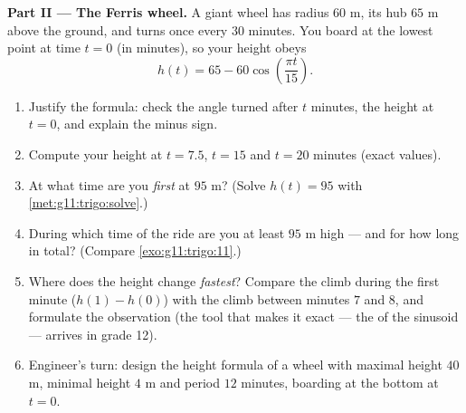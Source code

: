 \begin{problem}
\medskip
\noindent\textbf{Part II --- The Ferris wheel.}
A giant wheel has radius $60$ m, its hub $65$ m above the
ground, and turns once every $30$ minutes. You board at the
lowest point at time $t = 0$ (in minutes), so your height obeys
\[
h(t) = 65 - 60 \cos\!\left(\frac{\pi t}{15}\right).
\]
\begin{enumerate}[resume]
  \item Justify the formula: check the angle turned after $t$
        minutes, the height at $t = 0$, and explain the minus
        sign.
  \item Compute your height at $t = 7.5$, $t = 15$ and
        $t = 20$ minutes (exact values).
  \item At what time are you \emph{first} at $95$ m? (Solve
        $h(t) = 95$ with \cref{met:g11:trigo:solve}.)
  \item During which time  of the ride are you at least
        $95$ m high --- and for how long in total? (Compare
        \cref{exo:g11:trigo:11}.)
  \item Where does the height change \emph{fastest}? Compare the
        climb during the first minute
        ($h(1) - h(0)$) with the climb between minutes $7$ and
        $8$, and formulate the observation (the tool that makes
        it exact --- the  of the sinusoid --- arrives
        in grade 12).
  \item Engineer's turn: design the height formula of a wheel
        with maximal height $40$ m, minimal height $4$ m and
        period $12$ minutes, boarding at the bottom at
        $t = 0$.
\end{enumerate}


\end{problem}

